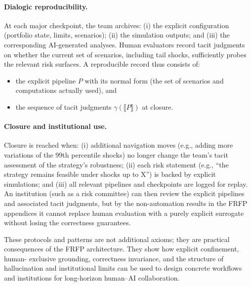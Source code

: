 \paragraph{Dialogic reproducibility.}
At each major checkpoint, the team archives:
(i) the explicit configuration (portfolio state, limits, scenarios);
(ii) the simulation outputs; and
(iii) the corresponding AI-generated analyses.
Human evaluators record tacit judgments on whether the current set of scenarios,
including tail shocks, sufficiently probes the relevant risk surfaces. A reproducible
record thus consists of:
\begin{itemize}
  \item the explicit pipeline \(P\) with its normal form (the set of scenarios and
        computations actually used), and
  \item the sequence of tacit judgments \(\gamma(\llbracket P \rrbracket)\) at closure.
\end{itemize}

\paragraph{Closure and institutional use.}
Closure is reached when:
(i) additional navigation moves (e.g., adding more variations of the \(99\)th percentile
shocks) no longer change the team’s tacit assessment of the strategy’s robustness;
(ii) each risk statement (e.g., “the strategy remains feasible under shocks up to
X”) is backed by explicit simulations; and
(iii) all relevant pipelines and checkpoints are logged for replay.
An institution (such as a risk committee) can then review the explicit pipelines
and associated tacit judgments, but by the non-automation results in the FRFP
appendices it cannot replace human evaluation with a purely explicit surrogate
without losing the correctness guarantees.

\medskip

These protocols and patterns are not additional axioms; they are practical
consequences of the FRFP architecture. They show how explicit confinement, human-
exclusive grounding, correctness invariance, and the structure of hallucination
and institutional limits can be used to design concrete workflows and institutions
for long-horizon human--AI collaboration.
